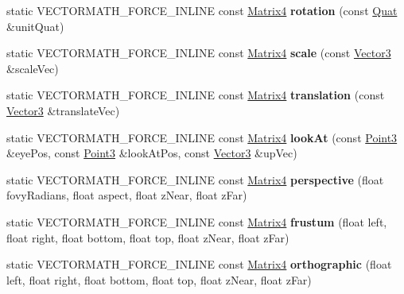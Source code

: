 \begin{DoxyCompactItemize}
\mbox{\label{classVectormath_1_1Aos_1_1Matrix4_ae72b79063c70eaa00e504966a2b56f1f}} 
static V\+E\+C\+T\+O\+R\+M\+A\+T\+H\+\_\+\+F\+O\+R\+C\+E\+\_\+\+I\+N\+L\+I\+NE const \hyperlink{classVectormath_1_1Aos_1_1Matrix4}{Matrix4} {\bfseries rotation} (const \hyperlink{classVectormath_1_1Aos_1_1Quat}{Quat} \&unit\+Quat)
\item 
\mbox{\label{classVectormath_1_1Aos_1_1Matrix4_a90f7ba57a31c662b516bdb013306866b}} 
static V\+E\+C\+T\+O\+R\+M\+A\+T\+H\+\_\+\+F\+O\+R\+C\+E\+\_\+\+I\+N\+L\+I\+NE const \hyperlink{classVectormath_1_1Aos_1_1Matrix4}{Matrix4} {\bfseries scale} (const \hyperlink{classVectormath_1_1Aos_1_1Vector3}{Vector3} \&scale\+Vec)
\item 
\mbox{\label{classVectormath_1_1Aos_1_1Matrix4_ae8eb0b5856de781d6a28aba7f7237b4a}} 
static V\+E\+C\+T\+O\+R\+M\+A\+T\+H\+\_\+\+F\+O\+R\+C\+E\+\_\+\+I\+N\+L\+I\+NE const \hyperlink{classVectormath_1_1Aos_1_1Matrix4}{Matrix4} {\bfseries translation} (const \hyperlink{classVectormath_1_1Aos_1_1Vector3}{Vector3} \&translate\+Vec)
\item 
\mbox{\label{classVectormath_1_1Aos_1_1Matrix4_a2b66c9f91bd1e3a655091421379e5ec1}} 
static V\+E\+C\+T\+O\+R\+M\+A\+T\+H\+\_\+\+F\+O\+R\+C\+E\+\_\+\+I\+N\+L\+I\+NE const \hyperlink{classVectormath_1_1Aos_1_1Matrix4}{Matrix4} {\bfseries look\+At} (const \hyperlink{classVectormath_1_1Aos_1_1Point3}{Point3} \&eye\+Pos, const \hyperlink{classVectormath_1_1Aos_1_1Point3}{Point3} \&look\+At\+Pos, const \hyperlink{classVectormath_1_1Aos_1_1Vector3}{Vector3} \&up\+Vec)
\item 
\mbox{\label{classVectormath_1_1Aos_1_1Matrix4_af3c44b61e15c2083ec76d184bcfcf74a}} 
static V\+E\+C\+T\+O\+R\+M\+A\+T\+H\+\_\+\+F\+O\+R\+C\+E\+\_\+\+I\+N\+L\+I\+NE const \hyperlink{classVectormath_1_1Aos_1_1Matrix4}{Matrix4} {\bfseries perspective} (float fovy\+Radians, float aspect, float z\+Near, float z\+Far)
\item 
\mbox{\label{classVectormath_1_1Aos_1_1Matrix4_ad45a9a98ae24f8f500567cb498445ca4}} 
static V\+E\+C\+T\+O\+R\+M\+A\+T\+H\+\_\+\+F\+O\+R\+C\+E\+\_\+\+I\+N\+L\+I\+NE const \hyperlink{classVectormath_1_1Aos_1_1Matrix4}{Matrix4} {\bfseries frustum} (float left, float right, float bottom, float top, float z\+Near, float z\+Far)
\item 
\mbox{\label{classVectormath_1_1Aos_1_1Matrix4_abb5c6f60272399655f25c33c9122fa7c}} 
static V\+E\+C\+T\+O\+R\+M\+A\+T\+H\+\_\+\+F\+O\+R\+C\+E\+\_\+\+I\+N\+L\+I\+NE const \hyperlink{classVectormath_1_1Aos_1_1Matrix4}{Matrix4} {\bfseries orthographic} (float left, float right, float bottom, float top, float z\+Near, float z\+Far)
\end{DoxyCompactItemize}


